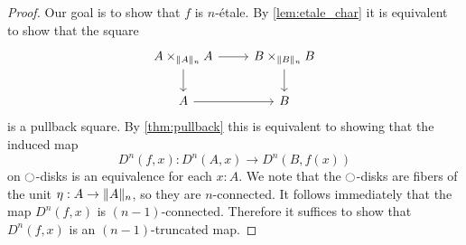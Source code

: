\documentclass[9pt,twosided]{amsart}
\begin{document}
\begin{proof}
  Our goal is to show that $f$ is $n$-\'etale. By \cref{lem:etale_char} it is equivalent to show that the square
  \begin{equation*}
    \begin{tikzcd}
      A\times_{\trunc{n}{A}} A \arrow[r] \arrow[d] & B \times_{\trunc{n}{B}} B \arrow[d] \\
      A \arrow[r] & B
    \end{tikzcd}
  \end{equation*}
  is a pullback square. By \cref{thm:pullback} this is equivalent to showing that the induced map
  \begin{equation*}
    D^{n}(f,x):D^{n}(A,x)\to D^{n}(B,f(x))
  \end{equation*}
  on ${\ocircle}$-disks is an equivalence for each $x:A$. We note that the ${\ocircle}$-disks are fibers of the unit $\eta:A \to \trunc{n}{A}$, so they are $n$-connected. It follows immediately that the map $D^{n}(f,x)$ is $(n-1)$-connected. Therefore it suffices to show that $D^{n}(f,x)$ is an $(n-1)$-truncated map.


\end{proof}
\end{document}

